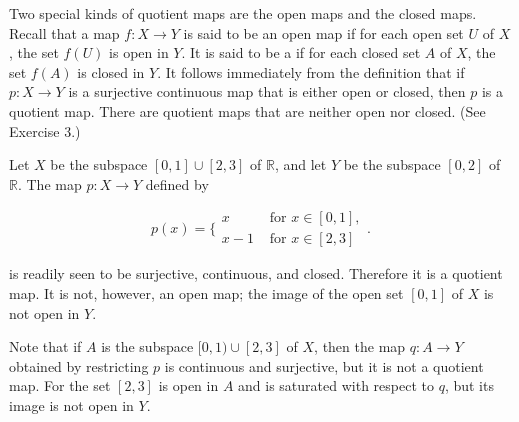 Two special kinds of quotient maps are the open maps and the closed maps. Recall that a map \(f : X \rightarrow Y\) is said to be an open map if for each open set \(U\) of \(X\), the set \(f( U)\) is open in \(Y\). It is said to be a  if for each closed set \(A\) of \(X\), the set \(f( A)\) is closed in \(Y\). It follows immediately from the definition that if \(p : X \rightarrow Y\) is a surjective continuous map that is either open or closed, then \(p\) is a quotient map. There are quotient maps that are neither open nor closed. (See Exercise 3.)

\begin{centeredblock}
\begin{example}
\label{ex:\thesection.\theexample}
 Let \(X\) be the subspace \([ {0,1}] \cup [ {2,3}]\) of \(\mathbb{R}\), and let \(Y\) be the subspace \([ {0,2}]\) of \(\mathbb{R}\). The map \(p : X \rightarrow Y\) defined by

 \[
 p(x) = \{ \begin{array}{ll} x & \text{ for }x \in [ {0,1}], \\ x - 1 & \text{ for }x \in [ {2,3}] \end{array}.
 \]

 is readily seen to be surjective, continuous, and closed. Therefore it is a quotient map. It is not, however, an open map; the image of the open set \([ {0,1}]\) of \(X\) is not open in \(Y\).

 Note that if \(A\) is the subspace \(\lbrack 0,1) \cup [ {2,3}]\) of \(X\), then the map \(q : A \rightarrow Y\) obtained by restricting \(p\) is continuous and surjective, but it is not a quotient map. For the set \([ {2,3}]\) is open in \(A\) and is saturated with respect to \(q\), but its image is not open in \(Y\).
\end{example}
\end{centeredblock}

